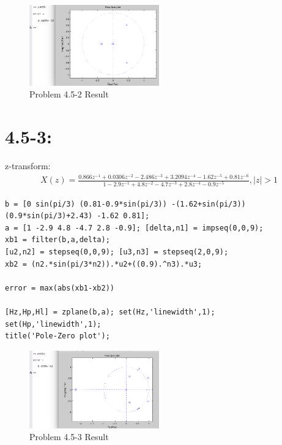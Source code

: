 \documentclass[11pt
  , a4paper
  , article
  , oneside
]{memoir}
\begin{document}
\begin{figure}[h!]
	\centering
	\includegraphics[width=0.5\textwidth,height=0.25\textwidth]{./images/p405-2.png}
	\caption{Problem 4.5-2 Result}
	\label{fig:Problem 4.5-2 Result}
\end{figure}

\section{4.5-3: }

z-transform:
\begin {equation}
\begin {split}
X(z)= \frac{0.866z^{-1}+0.0306z^{-2}-2.486z^{-3}+3.2094z^{-4}-1.62z^{-5}+0.81z^{-6}}{1-2.9z^{-1}+4.8z^{-2}-4.7z^{-3}+2.8z^{-4}-0.9z^{-5}}, |z|>1
\end{split}
\end {equation}

\begin{lstlisting}[style=termstyle]
b = [0 sin(pi/3) (0.81-0.9*sin(pi/3)) -(1.62+sin(pi/3)) (0.9*sin(pi/3)+2.43) -1.62 0.81];
a = [1 -2.9 4.8 -4.7 2.8 -0.9]; [delta,n1] = impseq(0,0,9);
xb1 = filter(b,a,delta);
[u2,n2] = stepseq(0,0,9); [u3,n3] = stepseq(2,0,9);
xb2 = (n2.*sin(pi/3*n2)).*u2+((0.9).^n3).*u3; 

error = max(abs(xb1-xb2))

[Hz,Hp,Hl] = zplane(b,a); set(Hz,'linewidth',1); set(Hp,'linewidth',1);
title('Pole-Zero plot');
\end{lstlisting}

\begin{figure}[h!]
	\centering
	\includegraphics[width=0.5\textwidth,height=0.25\textwidth]{./images/p405-3.png}
	\caption{Problem 4.5-3 Result}
	\label{fig:Problem 4.5-3 Result}
\end{figure}
\end{document}
